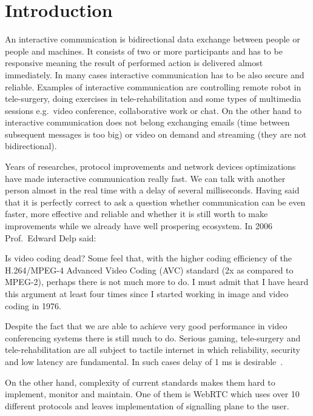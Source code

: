 \section{Introduction}
\label{sec:introduction}

An interactive communication is bidirectional data exchange between people or people and machines.
It consists of two or more participants and has to be responsive meaning the result of performed action is delivered almost immediately.
In many cases interactive communication has to be also secure and reliable.
Examples of interactive communication are controlling remote robot in tele-surgery, doing exercises in tele-rehabilitation and
some types of multimedia sessions e.g.\ video conference, collaborative work or chat.
On the other hand to interactive communication does not belong exchanging emails (time between subsequent messages is too big) or
video on demand and streaming (they are not bidirectional).

Years of researches, protocol improvements and network devices optimizations have made interactive communication really fast.
We can talk with another person almost in the real time with a delay of several milliseconds.
Having said that it is perfectly correct to ask a question whether communication can be even faster, more effective and reliable and whether it is still worth to make improvements while we already have well prospering ecosystem.
In 2006 Prof.\ Edward Delp said:
\begin{displayquote}
    Is video coding dead?
    Some feel that, with the higher coding efficiency of the H.264/MPEG-4 Advanced Video Coding (AVC) standard (2x as compared to MPEG-2), perhaps there is not much more to do.
    I must admit that I have heard this  argument at least four times since I started working in image and video coding in 1976.\cite{4015574}
\end{displayquote}
Despite the fact that we are able to achieve very good performance in video conferencing systems there is still much to do.
Serious gaming, tele-surgery and tele-rehabilitation are all subject to tactile internet in which reliability, security and low latency are fundamental.
In such cases delay of 1 ms is desirable~\cite{the-tactile-internet}.

On the other hand, complexity of current standards makes them hard to implement, monitor and maintain.
One of them is WebRTC which uses over 10 different protocols and leaves implementation of signalling plane to the user.


